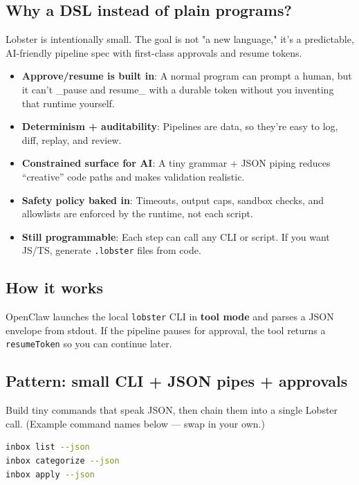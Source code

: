 \subsection{Why a DSL instead of plain programs?}


Lobster is intentionally small. The goal is not "a new language," it's a predictable, AI-friendly pipeline spec with first-class approvals and resume tokens.

\begin{itemize}
  \item \textbf{Approve/resume is built in}: A normal program can prompt a human, but it can’t \_pause and resume\_ with a durable token without you inventing that runtime yourself.
  \item \textbf{Determinism + auditability}: Pipelines are data, so they’re easy to log, diff, replay, and review.
  \item \textbf{Constrained surface for AI}: A tiny grammar + JSON piping reduces “creative” code paths and makes validation realistic.
  \item \textbf{Safety policy baked in}: Timeouts, output caps, sandbox checks, and allowlists are enforced by the runtime, not each script.
  \item \textbf{Still programmable}: Each step can call any CLI or script. If you want JS/TS, generate \texttt{.lobster} files from code.
\end{itemize}


\subsection{How it works}


OpenClaw launches the local \texttt{lobster} CLI in \textbf{tool mode} and parses a JSON envelope from stdout.
If the pipeline pauses for approval, the tool returns a \texttt{resumeToken} so you can continue later.

\subsection{Pattern: small CLI + JSON pipes + approvals}


Build tiny commands that speak JSON, then chain them into a single Lobster call. (Example command names below — swap in your own.)

\begin{lstlisting}[language=bash]
inbox list --json
inbox categorize --json
inbox apply --json
\end{lstlisting}


